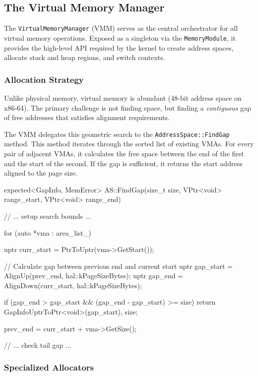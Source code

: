 \documentclass[a4paper,10pt,twoside]{report}
\theoremstyle{definition}
\begin{document}
\subsection{The Virtual Memory Manager}

The \texttt{VirtualMemoryManager} (VMM) serves as the central orchestrator for all virtual memory operations. Exposed as a singleton via the \texttt{MemoryModule}, it provides the high-level API required by the kernel to create address spaces, allocate stack and heap regions, and switch contexts.

\subsubsection{Allocation Strategy}

Unlike physical memory, virtual memory is abundant (48-bit address space on x86-64). The primary challenge is not finding space, but finding a \textit{contiguous} gap of free addresses that satisfies alignment requirements.

The VMM delegates this geometric search to the \texttt{AddressSpace::FindGap} method. This method iterates through the sorted list of existing VMAs. For every pair of adjacent VMAs, it calculates the free space between the end of the first and the start of the second. If the gap is sufficient, it returns the start address aligned to the page size.

\clearpage

\begin{cppcode}[caption={Gap Search Logic}, label={lst:find_gap}]
expected<GapInfo, MemError> AS::FindGap(size_t size, VPtr<void> range_start, VPtr<void> range_end)
{
    // ... setup search bounds ...
    
    for (auto *vma : area_list_) {
        uptr curr_start = PtrToUptr(vma->GetStart());
        
        // Calculate gap between previous end and current start
        uptr gap_start = AlignUp(prev_end, hal::kPageSizeBytes);
        uptr gap_end   = AlignDown(curr_start, hal::kPageSizeBytes);

        if (gap_end > gap_start && (gap_end - gap_start) >= size) {
            return GapInfo{UptrToPtr<void>(gap_start), size};
        }

        prev_end = curr_start + vma->GetSize();
    }
    // ... check tail gap ...
}
\end{cppcode}

\subsubsection{Specialized Allocators}
\end{document}
